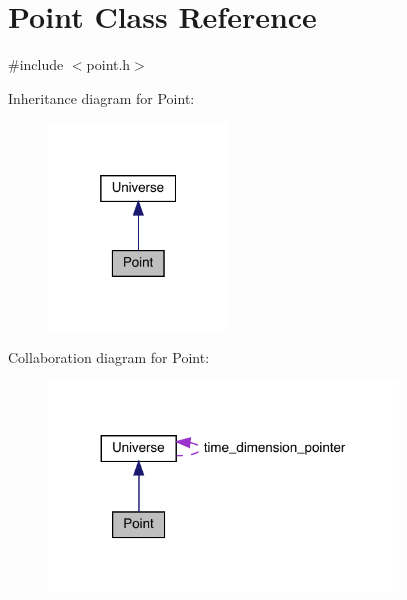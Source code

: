 \hypertarget{class_point}{}\section{Point Class Reference}
\label{class_point}


{\ttfamily \#include $<$point.\+h$>$}



Inheritance diagram for Point\+:\nopagebreak
\begin{figure}[H]
\begin{center}
\leavevmode
\includegraphics[width=136pt]{class_point__inherit__graph}
\end{center}
\end{figure}


Collaboration diagram for Point\+:
\nopagebreak
\begin{figure}[H]
\begin{center}
\leavevmode
\includegraphics[width=263pt]{class_point__coll__graph}
\end{center}
\end{figure}
